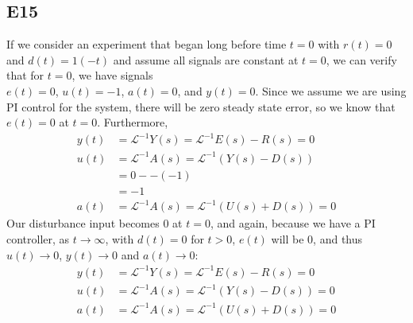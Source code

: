 \documentclass[10pt,titlepage]{article}
\begin{document}
	\subsection*{E15}
		If we consider an experiment that began long before time $t=0$ with $r(t)=0$ and $d(t)=1(-t)$ and assume all signals are constant at $t=0$, we can verify that for $t=0$, we have signals\\
		$e(t)=0$, $u(t)=-1$, $a(t)=0$, and $y(t)=0$.
	Since we assume we are using PI control for the system, there will be zero steady state error, so we know that $e(t)=0$ at $t=0$. Furthermore, 
	\begin{align*}
		y(t)&=\mathcal{L}^{-1}Y(s)=\mathcal{L}^{-1}E(s)-R(s)=0\\
		u(t)&=\mathcal{L}^{-1}A(s)=\mathcal{L}^{-1}(Y(s)-D(s))\\
		&=0--(-1)\\
		&=-1\\
		a(t)&=\mathcal{L}^{-1}A(s)=\mathcal{L}^{-1}(U(s)+D(s))=0
	\end{align*}
	Our disturbance input becomes 0 at $t=0$, and again, because we have a PI controller, as $t\to \infty$, with $d(t)=0$ for $t>0$, $e(t)$ will be 0, and thus $u(t)\to0$, $y(t)\to0$ and $a(t)\to0$:
	\begin{align*}
		y(t)&=\mathcal{L}^{-1}Y(s)=\mathcal{L}^{-1}E(s)-R(s)=0\\
		u(t)&=\mathcal{L}^{-1}A(s)=\mathcal{L}^{-1}(Y(s)-D(s))=0\\
		a(t)&=\mathcal{L}^{-1}A(s)=\mathcal{L}^{-1}(U(s)+D(s))=0
	\end{align*}
	
\end{document}
